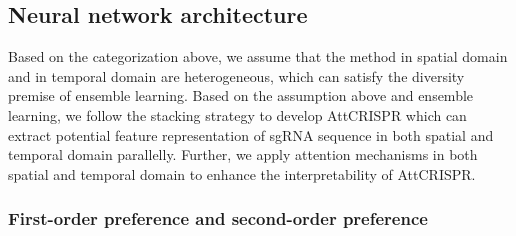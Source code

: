 \documentclass{bioinfo}
\begin{document}
\subsection{Neural network architecture}

Based on the categorization above, we assume that the method in spatial domain and in temporal domain are heterogeneous, 
which can satisfy the diversity premise of ensemble learning. 
Based on the assumption above and ensemble learning, we follow the stacking strategy to develop AttCRISPR 
which can extract potential feature representation of sgRNA sequence in both spatial and temporal domain parallelly. 
Further, we apply attention mechanisms in both spatial and temporal domain to enhance the interpretability of AttCRISPR.

\subsubsection{First-order preference and second-order preference}
\end{document}

